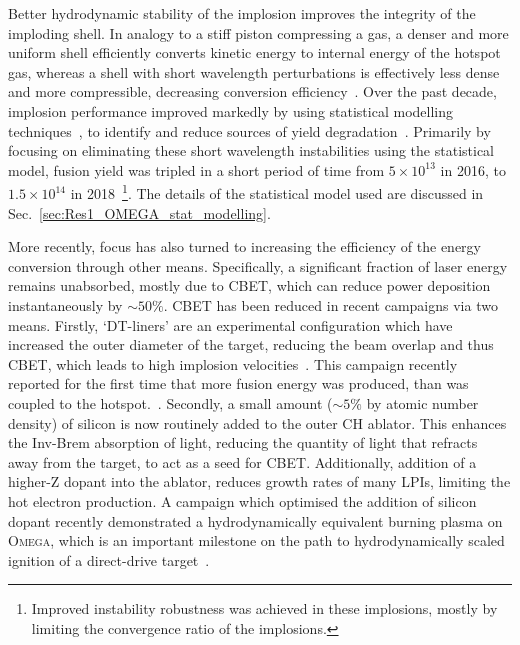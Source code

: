 Better hydrodynamic stability of the implosion improves the integrity of the imploding shell.
In analogy to a stiff piston compressing a gas, a denser and more uniform shell efficiently converts kinetic energy to internal energy of the hotspot gas, whereas a shell with short wavelength perturbations is effectively less dense and more compressible, decreasing conversion efficiency~\cite{betti_deceleration_2002}.
Over the past decade, implosion performance improved markedly by using statistical modelling techniques~\cite{lees_experimentally_2021}, to identify and reduce sources of yield degradation~\cite{lees_understanding_2023}.
Primarily by focusing on eliminating these short wavelength instabilities using the statistical model, fusion yield was tripled in a short period of time from $5\times10^{13}$ in 2016, to $1.5\times10^{14}$ in 2018~\cite{gopalaswamy_tripled_2019}\footnote{Improved instability robustness was achieved in these implosions, mostly by limiting the convergence ratio of the implosions.}.
The details of the statistical model used are discussed in Sec.~\ref{sec:Res1_OMEGA_stat_modelling}.

More recently, focus has also turned to increasing the efficiency of the energy conversion through other means.
Specifically, a significant fraction of laser energy remains unabsorbed, mostly due to \ac{CBET}, which can reduce power deposition instantaneously by $\sim50\%$.
\ac{CBET} has been reduced in recent campaigns via two means.
Firstly, `DT-liners' are an experimental configuration which have increased the outer diameter of the target, reducing the beam overlap and thus \ac{CBET}, which leads to high implosion velocities~\cite{williams_high_2021}.
This campaign recently reported for the first time that more fusion energy was produced, than was coupled to the hotspot.~\cite{williams_demonstration_2024}.
Secondly, a small amount ($\sim5\%$ by atomic number density) of silicon is now routinely added to the outer CH ablator.
This enhances the \ac{Inv-Brem} absorption of light, reducing the quantity of light that refracts away from the target, to act as a seed for \ac{CBET}.
Additionally, addition of a higher-Z dopant into the ablator, reduces growth rates of many \ac{LPIs}, limiting the hot electron production.
A campaign which optimised the addition of silicon dopant recently demonstrated a hydrodynamically equivalent burning plasma on \textsc{Omega}, which is an important milestone on the path to hydrodynamically scaled ignition of a direct-drive target~\cite{gopalaswamy_demonstration_2024}.

